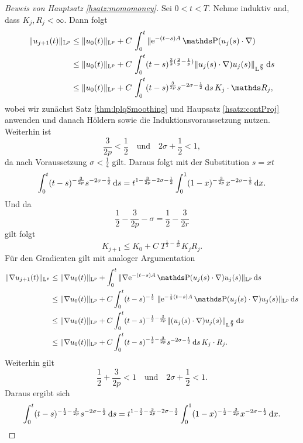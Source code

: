 \begin{proof}[Beweis von Hauptsatz \ref{hsatz:momomoney}]
  Sei $0 < t < T$. 
  Nehme induktiv and, dass $K_j, R_j < \infty$.
  Dann folgt
  \begin{align*}
    \|u_{j + 1}(t) \|_{\Ell^p}
    &\leq \|u_0(t)\|_{\Ell^p} + C \, \int_0^t \|\e^{-(t - s) A} \PP(u_j(s) \cdot \nabla) \\
    &\leq \|u_0(t)\|_{\Ell^p} + C \, \int_0^t (t - s)^{\frac{3}{2} (\frac{2}{p} - \frac{1}{p})} \|u_j(s) \cdot \nabla) u_j(s) \|_{\Ell^{\frac{p}{2}}} \d s \\
    &\leq \|u_0(t)\|_{\Ell^p} + C \, \int_0^t (t - s)^{\frac{3}{2p}} s^{-2\sigma - \frac{1}{2}} \d s \, K_j \cdot \R_j,
  \end{align*}
  wobei wir zunächst Satz \ref{thm:lplqSmoothing} und Haupsatz \ref{hsatz:contProj} anwenden und danach Höldern sowie die Induktionsvoraussetzung nutzen.
  Weiterhin ist
  $$
  \frac{3}{2p} < \frac{1}{2} \quad\text{und}\quad 2\sigma + \frac{1}{2} < 1,
  $$
  da nach Voraussetzung $\sigma < \frac{1}{4}$ gilt.
  Daraus folgt mit der Substitution $s = xt$
  $$
  \int_0^t (t - s)^{-\frac{3}{2p}} s^{-2\sigma - \frac{1}{2}} \, {\operatorname{d}\!{s}} = t^{1 - \frac{3}{2p} - 2\sigma - \frac{1}{2}} \int_0^1 ( 1 - x )^{-\frac{3}{2p}}  x^{- 2\sigma - \frac{1}{2}} \, {\operatorname{d}\!{x}}.
  $$
  Und da
  $$
  \frac{1}{2} - \frac{3}{2p} - \sigma = \frac{1}{2} - \frac{3}{2r}
  $$
  gilt folgt
  $$
  K_{j + 1} \leq K_0 + C\; T^{\frac{1}{2} - \frac{3}{2r}} K_j R_j.
  $$
  Für den Gradienten gilt mit analoger Argumentation
  \begin{align*}
    \|\nabla u_{j + 1}(t) \|_{\Ell^p}
    &\leq \|\nabla u_0 (t) \|_{\Ell^p} + \int_0^t \|\nabla \e^{-(t - s) A} \PP(u_j(s) \cdot \nabla) u_j(s) \|_{\Ell^p} \d s \\
    &\leq \|\nabla u_0(t) \|_{\Ell^p} + C \int_0^t (t - s)^{-\frac{1}{2}} \; \|\e^{-\frac{1}{2}(t - s)A} \PP(u_j(s) \cdot \nabla) u_j(s) \|_{\Ell^p} \d s \\
    &\leq \|\nabla u_0(t) \|_{\Ell^p} + C \int_0^t (t - s)^{-\frac{1}{2} - \frac{3}{2p}} \|(u_j(s) \cdot \nabla) u_j(s) \|_{\Ell^{\frac{p}{2}}} \d s \\ 
    &\leq \|\nabla u_0(t) \|_{\Ell^p} + C \int_0^t (t - s)^{-\frac{1}{2} - \frac{3}{2p}} s^{-2\sigma - \frac{1}{2}} \d s \, K_j \cdot R_j.
  \end{align*}
  Weiterhin gilt
  $$
  \frac{1}{2} + \frac{3}{2p} < 1 \quad\text{und}\quad 2\sigma + \frac{1}{2} < 1.
  $$
  Daraus ergibt sich
  $$
  \int_0^t (t - s)^{-\frac{1}{2} - \frac{3}{2p}} s^{-2\sigma - \frac{1}{2}} \, {\operatorname{d}\!{s}} 
  = t^{1 - \frac{1}{2} - \frac{3}{2p} - 2\sigma - \frac{1}{2}} \int_0^1 (1 - x)^{-\frac{1}{2} - \frac{3}{2p}} x^{-2\sigma - \frac{1}{2}} \, {\operatorname{d}\!{x}}.
$$
\end{proof}
